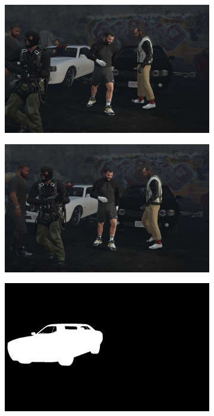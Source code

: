\begin{figure}
\centering
\begin{subfigure}[t]{0.19\textwidth}
\centering
\includegraphics[scale=0.07]{good_examples/visual_34430_img.png}
\end{subfigure}
\begin{subfigure}[t]{0.19\textwidth}
\centering
\includegraphics[scale=0.07]{good_examples/visual_34430_img1.png}
\end{subfigure}
\begin{subfigure}[t]{0.19\textwidth}
\centering
\includegraphics[scale=0.07]{good_examples/visual_34430_gt.png}

\end{subfigure}
\end{figure}

